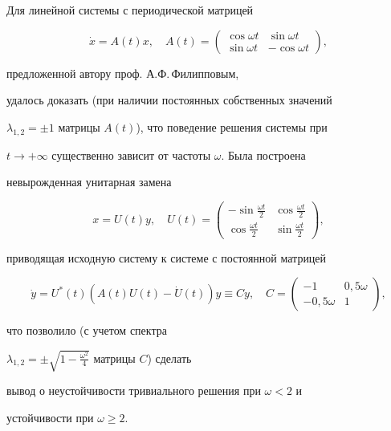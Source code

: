 \begin{exam}


Для линейной системы с периодической матрицей


$$


\Dot x=A(t)x,\quad A(t)=


\begin{pmatrix}


\cos\omega t & \sin \omega t \\


\sin\omega t & -\cos \omega t


\end{pmatrix}


,


$$


предложенной автору проф. А.Ф.\,Филипповым,


удалось доказать (при наличии постоянных собственных значений 


$\lambda_{1,2}=\pm1$ матрицы $A(t)$), что поведение решения системы при 


$t\to+\infty$ существенно зависит от частоты $\omega$. Была построена 


невырожденная унитарная замена


$$


x=U(t)y,\quad U(t)=


\begin{pmatrix}


-\sin\frac{\omega t}{2} & \cos\frac{\omega t}{2} \\


\cos\frac{\omega t}{2} & \sin\frac{\omega t}{2}


\end{pmatrix}


,


$$


приводящая исходную систему к системе с постоянной матрицей


$$


\Dot y=U^*(t)(A(t)U(t)-\Dot U(t))y\equiv C y,\quad


C=


\begin{pmatrix}


-1 & 0,5\omega \\ -0,5\omega & 1


\end{pmatrix}


,


$$


что позволило (с учетом спектра 


$\lambda_{1,2}=\pm\sqrt{1-\frac{\omega^2}{4}}$ матрицы $C$) сделать 


вывод о неустойчивости тривиального решения при $\omega<2$ и 


устойчивости при $\omega\ge2$.


\end{exam}





